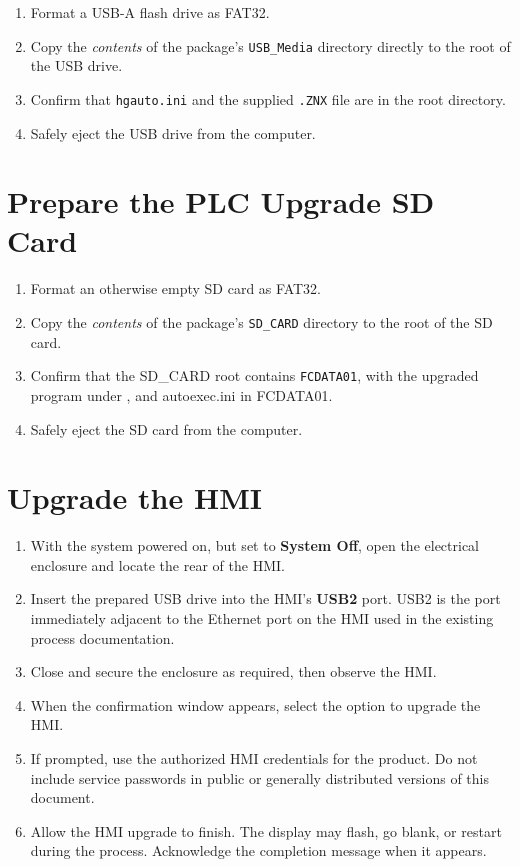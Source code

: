 \documentclass[11pt]{article}
\begin{document}
\begin{enumerate}
  \item Format a USB-A flash drive as FAT32.
  \item Copy the \emph{contents} of the package's \texttt{USB\_Media} directory
        directly to the root of the USB drive.
  \item Confirm that \texttt{hgauto.ini} and the supplied \texttt{.ZNX} file are
        in the root directory.
  \item Safely eject the USB drive from the computer.
\end{enumerate}

\section*{Prepare the PLC Upgrade SD Card}

\begin{enumerate}
  \item Format an otherwise empty SD card as FAT32.
  \item Copy the \emph{contents} of the package's \texttt{SD\_CARD} directory to
        the root of the SD card.
  \item Confirm that the SD\_CARD root contains \texttt{FCDATA01}, with the upgraded program under , and autoexec.ini in 
  FCDATA01.
  \item Safely eject the SD card from the computer.
\end{enumerate}

\section*{Upgrade the HMI}

\begin{enumerate}
  \item With the system powered on, but set to \textbf{System Off}, open the
        electrical enclosure and locate the rear of the HMI.
  \item Insert the prepared USB drive into the HMI's \textbf{USB2} port. USB2 is
        the port immediately adjacent to the Ethernet port on the HMI used in
        the existing process documentation.
  \item Close and secure the enclosure as required, then observe the HMI.
  \item When the confirmation window appears, select the option to upgrade the
        HMI.
  \item If prompted, use the authorized HMI credentials for the product. Do not
        include service passwords in public or generally distributed versions of
        this document.
  \item Allow the HMI upgrade to finish. The display may flash, go blank, or
        restart during the process. Acknowledge the completion message when it
        appears.
\end{enumerate}
\end{document}
